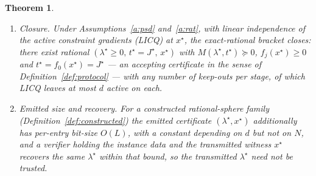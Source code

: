 \documentclass[11pt]{article}
\newtheorem{theorem}{Theorem}
\theoremstyle{definition}
\theoremstyle{remark}
\renewcommand{\_}{\ifdim\fontdimen3\font=0pt\relax\char`\_\else\textunderscore\fi\hspace{0pt}}
\begin{document}
\begin{theorem}\label{thm:main}\leavevmode
\begin{enumerate}
\item[(i)] \emph{Closure.} Under Assumptions~\ref{a:psd} and~\ref{a:rat},
with linear independence of the active constraint gradients (LICQ) at
$x^\star$, the exact-rational bracket closes: there exist rational
$(\lambda^\star\ge0,\,t^\star=J^\star,\,x^\star)$ with
$M(\lambda^\star,t^\star)\succeq0$, $f_j(x^\star)\ge0$ and
$t^\star=f_0(x^\star)=J^\star$ --- an accepting certificate in the sense of
Definition~\ref{def:protocol} --- with any number of keep-outs per stage, of
which LICQ leaves at most $d$ active on each.
\item[(ii)] \emph{Emitted size and recovery.} For a constructed
rational-sphere family (Definition~\ref{def:constructed}) the emitted
certificate $(\lambda^\star,x^\star)$ additionally has \emph{per-entry}
bit-size $O(L)$, with a constant depending on $d$ but not on $N$, and a
verifier holding the instance data and the transmitted witness $x^\star$
recovers the same $\lambda^\star$ within that bound, so the transmitted
$\lambda^\star$ need not be trusted.
\end{enumerate}
\end{theorem}
\end{document}
